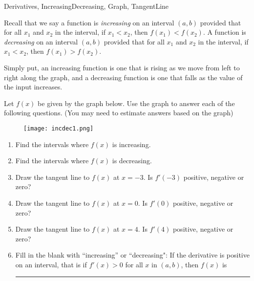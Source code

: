 \begin{tagblock}{Derivatives, IncreasingDecreasing, Graph, TangentLine}
\begin{question}

 Recall that we say a function is \emph{increasing} on an interval $(a,b)$ provided that for all $x_1$ and $x_2$ in the interval, if $x_1 < x_2$, then $f(x_1) < f(x_2)$.  A function is \emph{decreasing} on an interval $(a,b)$ provided that for all $x_1$ and $x_2$ in the interval, if $x_1 < x_2$, then $f(x_1) > f(x_2)$.

\bigskip

Simply put, an increasing function is one that is rising as we move from left to right along the graph, and a decreasing function is one that falls as the value of the input increases.


 

  
Let $f(x)$ be given by the graph below.  Use the graph to answer each of the following questions. (You may need to estimate answers based on the graph)
\begin{figure}[h]
\centering
\texttt{[image: incdec1.png]} 
\end{figure}

\begin{enumerate}
\item Find the intervals where $f(x)$ is increasing.  

\vspace{.25in}
\item Find the intervals where $f(x)$ is decreasing.  
\vspace{.25in}

\item Draw the tangent line to $f(x)$ at $x=-3$.  Is $f'(-3)$ positive, negative or zero?  
\vspace{.25in}

\item Draw the tangent line to $f(x)$ at $x=0$.  Is $f'(0)$ positive, negative or zero?  
\vspace{.25in}

\item Draw the tangent line to $f(x)$ at $x=4$.  Is $f'(4)$ positive, negative or zero?  

\vspace{.25in}

\item Fill in the blank with ``increasing'' or ``decreasing":  If the derivative is positive on an interval, that is if $f'(x) >0$ for all $x$ in $(a,b)$, then $f(x)$ is \rule{4cm}{0.1mm}
\vspace{.25in}


\end{enumerate}
\end{question}
\end{tagblock}
